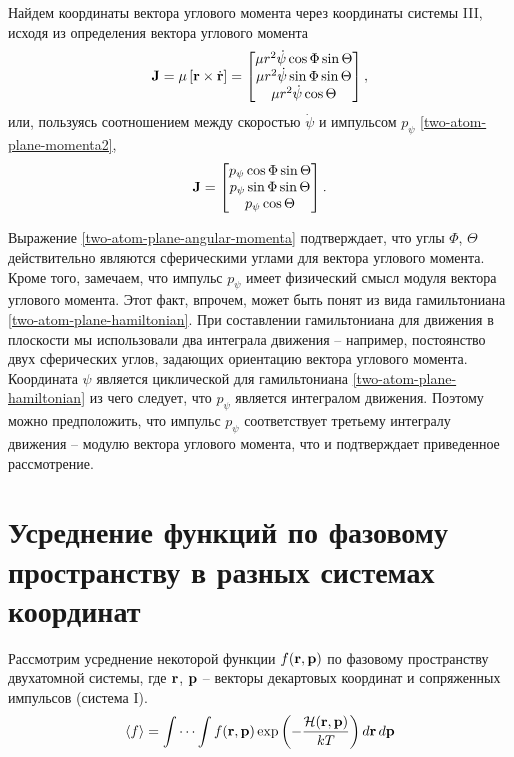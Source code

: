 Найдем координаты вектора углового момента через координаты системы III, исходя из определения вектора углового момента 
\begin{gather}
    \mathbf{J} = \mu \left[ \mathbf{r} \times \dot{\mathbf{r}} \right] = 
    \begin{bmatrix}
        \mu r^2 \dot{\psi} \cos \Phi \sin \Theta \\ 
        \mu r^2 \dot{\psi} \sin \Phi \sin \Theta \\
        \mu r^2 \dot{\psi} \cos \Theta
    \end{bmatrix},
\end{gather}
или, пользуясь соотношением между скоростью $\dot{\psi}$ и импульсом $p_\psi$ \eqref{two-atom-plane-momenta2}, 
\begin{gather}
    \mathbf{J} = 
    \begin{bmatrix}
        p_\psi \cos \Phi \sin \Theta \\
        p_\psi \sin \Phi \sin \Theta \\
        p_\psi \cos \Theta
    \end{bmatrix}. \label{two-atom-plane-angular-momenta}
\end{gather}

Выражение \eqref{two-atom-plane-angular-momenta} подтверждает, что углы $\Phi$, $\Theta$ действительно являются сферическими углами для вектора углового момента. Кроме того, замечаем, что импульс $p_\psi$ имеет физический смысл модуля вектора углового момента. Этот факт, впрочем, может быть понят из вида гамильтониана \eqref{two-atom-plane-hamiltonian}. При составлении гамильтониана для движения в плоскости мы использовали два интеграла движения -- например, постоянство двух сферических углов, задающих ориентацию вектора углового момента. Координата $\psi$ является циклической для гамильтониана \eqref{two-atom-plane-hamiltonian} из чего следует, что $p_\psi$ является интегралом движения. Поэтому можно предположить, что импульс $p_\psi$ соответствует третьему интегралу движения -- модулю вектора углового момента, что и подтверждает приведенное рассмотрение. \par

\section{Усреднение функций по фазовому пространству в разных системах координат} \label{section:averaging}

Рассмотрим усреднение некоторой функции $f(\mathbf{r}, \mathbf{p})$ по фазовому пространству двухатомной системы, где $\mathbf{r}$, $\mathbf{p}$ -- векторы декартовых координат и сопряженных импульсов (система I). 
\begin{gather}
    \langle f \rangle = \idotsint f(\mathbf{r}, \mathbf{p}) \exp \left( -\frac{\mathcal{H}(\mathbf{r},\mathbf{p})}{kT} \right) d \mathbf{r} \, d\mathbf{p} \label{two-atom-mean}
\end{gather}

